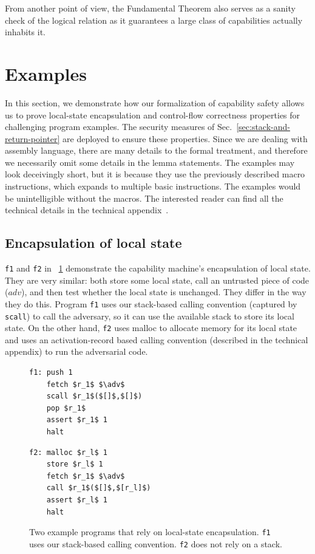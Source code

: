 \documentclass{llncs}
\newcommand{\sectionname}{Sec.}
\newcommand{\var}[1]{\mathit{#1}}
\newcommand{\adv}{\var{adv}}
\begin{document}
From another point of view, the Fundamental Theorem also serves as a sanity
check of the logical relation as it guarantees a large class of
capabilities actually inhabits it.

\section{Examples}
\label{sec:examples}
In this section, we demonstrate how our formalization of capability
safety allows us to prove local-state encapsulation and control-flow
correctness properties for challenging program examples. The security
measures of \sectionname~\ref{sec:stack-and-return-pointer} are deployed to
ensure these properties. Since we are dealing with assembly language,
there are many details to the formal treatment, and therefore we
necessarily omit some details in the lemma statements. The
examples may look deceivingly short, but it is because they use the
previously described macro instructions, which expands to multiple
basic instructions. The examples would be unintelligible without the
macros. The interested reader can find all the technical details in
the technical appendix~\cite{technical_appendix}.

\subsection{Encapsulation of local state}
\texttt{\footnotesize{f1}} and \texttt{\footnotesize{f2}} in
\figurename~\ref{fig:prog-f1-and-f2} demonstrate the capability
machine's encapsulation of local state. They are very similar: both
store some local state, call an untrusted piece of code ($\adv$), and
then test whether the local state is unchanged. They differ in the way
they do this. Program \texttt{\footnotesize{f1}} uses our stack-based
calling convention (captured by \texttt{\footnotesize{scall}}) to call
the adversary, so it can use the available stack to store its local
state.  On the other hand, \texttt{\footnotesize{f2}} uses malloc to
allocate memory for its local state and uses an activation-record
based calling convention (described in the technical appendix) to run
the adversarial code.

\begin{figure}[t]
  \centering

  \begin{minipage}[t]{4.1cm}
  \begin{lstlisting}
f1: push 1
    fetch $r_1$ $\adv$
    scall $r_1$($[]$,$[]$)
    pop $r_1$
    assert $r_1$ 1
    halt
  \end{lstlisting}
  \end{minipage}
  \begin{minipage}[t]{4.1cm}
  \begin{lstlisting}
f2: malloc $r_l$ 1
    store $r_l$ 1
    fetch $r_1$ $\adv$
    call $r_1$($[]$,$[r_l]$)
    assert $r_l$ 1
    halt
  \end{lstlisting}
  \end{minipage}
  \caption{Two example programs that rely on local-state encapsulation. \texttt{f1} uses our stack-based calling convention. \texttt{f2} does not rely on a stack.}
  \label{fig:prog-f1-and-f2}
\end{figure}
\end{document}
